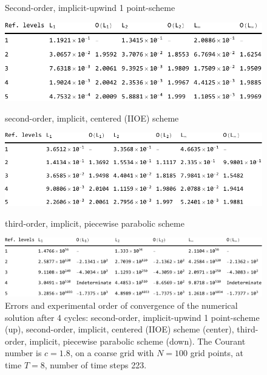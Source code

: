 \documentclass[../thesis.tex]{subfiles}
\begin{document}
\begin{figure}[H]
	\centering
    \caption*{Second-order, implicit-upwind 1 point-scheme}
	\includegraphics[width=\textwidth]{tab-1point-c1p8-T8-limit0-smooth.pdf}
    \caption*{second-order, implicit, centered (IIOE) scheme}
	\includegraphics[width=\textwidth]{tab-iioe-c1p8-T8-limit0-smooth.pdf}
    \caption*{third-order, implicit, piecewise parabolic scheme}
	\includegraphics[width=\textwidth]{tab-implicit-ppm-c1p8-T8-limit0-smooth.pdf}
	\caption{Errors and experimental order of convergence of the numerical solution after 4 cycles: second-order, implicit-upwind 1 point-scheme (up), second-order, implicit, centered (IIOE) scheme (center), third-order, implicit, piecewise parabolic scheme (down). The Courant number is \(c = 1.8\), on a coarse grid with \(N = 100\) grid points, at time \(T = 8\), number of time steps 223.}
	\label{tab:c1p8-T8-limit0-smooth}
\end{figure}
\end{document}
